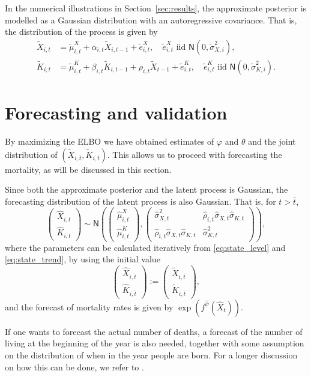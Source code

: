 \documentclass[11pt]{article}
\newcommand{\m}[1]{\begin{pmatrix}
#1
\end{pmatrix}}
\newcommand{\pa}[1]{\left(#1\right)}
\begin{document}
In the numerical illustrations in Section~\ref{sec:results}, the approximate posterior is modelled as a Gaussian distribution with an autoregressive covariance. That is, the distribution of the process is given by
\begin{align*}
    \tilde X_{i,t} &= \tilde\mu^X_{i,t } + \alpha_{i,t}\tilde X_{i,t-1}  + \tilde e^X_{i,t},\quad \tilde e^X_{i,t} \text{ iid } \mathsf N(0,\tilde\sigma^2_{X,i}),\\
    \tilde K_{i,t} &= \tilde \mu^K_{i,t} + \beta_{i,t}\tilde K_{i,t-1} + \rho_{i,t}\tilde X_{t-1} + \tilde e^K_{i,t},\quad \tilde e^K_{i,t} \text{ iid } \mathsf N(0,\tilde \sigma^2_{K,i}).
\end{align*}

\section{Forecasting and validation}\label{sec:forecastValidation}
By maximizing the ELBO we have obtained estimates of $\varphi$ and $\theta$ and the joint distribution of $(\tilde X_{i,\bar t},\tilde K_{i,\bar t})$. This allows us to proceed with forecasting the mortality, as will be discussed in this section.

Since both the approximate posterior and the latent process is Gaussian, the forecasting distribution of the latent process is also Gaussian. That is, for $t>\bar t$,
$$
\m{
\hat X_{i,t}\\ \hat K_{i,t}} 
\sim \mathsf N\pa{
\m{\hat\mu^X_{i,t}\\
\hat\mu^K_{i,t}}
,
\m{
\hat \sigma^2_{X,t} & \hat\rho_{i,t}\hat \sigma_{X,t}\hat \sigma_{K,t}\\
    \hat\rho_{i,t}\hat \sigma_{X,t}\hat \sigma_{K,t} & \hat \sigma^2_{K,t}
}
},
$$
where the parameters can be calculated iteratively from \eqref{eq:state_level} and \eqref{eq:state_trend}, by using the initial value
$$
    \m{
\hat X_{i,\bar t}\\ \hat K_{i,\bar t}}:=  	\m{
\tilde X_{i,\bar t}\\ \tilde K_{i,\bar t}},
$$
and  the forecast of mortality rates is given by $\exp(f^{\hat \psi}(\hat X_t))$.

If one wants to forecast the actual number of deaths, a forecast of the number of living at the beginning of the year is also needed, together with some assumption on the distribution of when in the year people are born. For a longer discussion on how this can be done, we refer to \cite{andersson2020mortality}.
\end{document}
